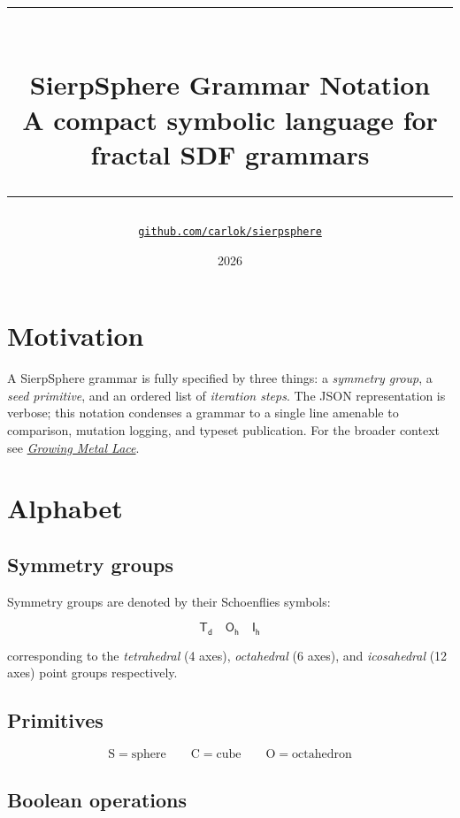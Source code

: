 \documentclass[11pt, a4paper]{article}
\title{%
  {\color{accent}\rule{\linewidth}{2pt}}\\[6pt]
  \textbf{\LARGE SierpSphere Grammar Notation}\\[4pt]
  \large A compact symbolic language for fractal SDF grammars\\[6pt]
  {\color{accent}\rule{\linewidth}{1pt}}
}
\author{\href{https://github.com/carlok/sierpsphere}%
        {\texttt{github.com/carlok/sierpsphere}}}
\date{2026}
\newcommand{\G}[1]{\mathsf{#1}}
\newcommand{\prim}[1]{\mathrm{#1}}
\begin{document}
\maketitle
\thispagestyle{empty}

\vspace{0.5em}
{\small\tableofcontents}
\vspace{1em}

\section{Motivation}
\label{sec:motivation}

A SierpSphere grammar is fully specified by three things: a \emph{symmetry
group}, a \emph{seed primitive}, and an ordered list of \emph{iteration steps}.
The JSON representation is verbose; this notation condenses a grammar to a
single line amenable to comparison, mutation logging, and typeset publication.
For the broader context see
\href{journey.pdf}{\emph{Growing Metal Lace}}.

\section{Alphabet}
\label{sec:alphabet}

\subsection{Symmetry groups}
\label{subsec:groups}

Symmetry groups are denoted by their Schoenflies symbols:

\[
  \G{T_d} \quad \G{O_h} \quad \G{I_h}
\]

corresponding to the \textit{tetrahedral} (4 axes),
\textit{octahedral} (6 axes), and \textit{icosahedral} (12 axes) point groups
respectively.

\subsection{Primitives}
\label{subsec:primitives}

\[
  \prim{S} = \text{sphere} \qquad
  \prim{C} = \text{cube}   \qquad
  \prim{O} = \text{octahedron}
\]

\subsection{Boolean operations}
\label{subsec:ops}
\end{document}
